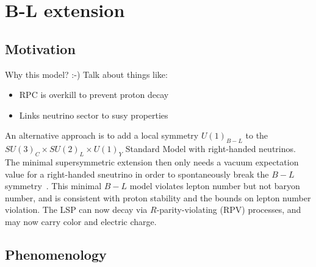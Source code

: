 \section{B-L extension}
\label{sec:theory_bl_extension}


\FloatBarrier
\subsection{Motivation}

{\color{red} Why this model? :-) Talk about things like:
\begin{itemize}
\item RPC is overkill to prevent proton decay
\item Links neutrino sector to susy properties
\end{itemize}
}

An alternative approach is to add a local symmetry $U(1)_{B-L}$ to the
$SU(3)_C \times SU(2)_L \times U(1)_Y$ Standard Model with right-handed
neutrinos.
The minimal supersymmetric extension then only needs a vacuum expectation value
for a right-handed sneutrino in order to spontaneously break the
$B-L$ symmetry~\cite{FileviezPerez:2008sx, Barger:2008wn, FileviezPerez:2009gr,
Everett:2009vy, Evans:1986ada, Lukas:1998yy, Braun:2005ux, Braun:2005nv,
Braun:2006ae, Ambroso:2009jd, Ambroso:2010pe, Ovrut:2012wg}.
This minimal $B-L$ model violates lepton number but not baryon number, and is
consistent with proton stability and the bounds on lepton number violation.
The LSP can now decay via $R$-parity-violating (RPV) processes, and may now
carry color and electric charge.

\FloatBarrier
\subsection{Phenomenology}

